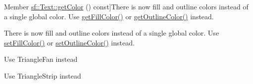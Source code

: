 \begin{DoxyRefList}
%
Member \mbox{\hyperlink{classsf_1_1_text_a77ba664285efd72ab4ce85b9cbbeeb21}{sf\+:\+:Text\+:\+:get\+Color}} () const]There is now fill and outline colors instead of a single global color. Use \mbox{\hyperlink{classsf_1_1_text_a6b4ba8c435b59e1e05f831e6230dc537}{get\+Fill\+Color()}} or \mbox{\hyperlink{classsf_1_1_text_a53559d563461089f1172571b375442dc}{get\+Outline\+Color()}} instead.  
\item[\label{deprecated__deprecated000016}%
\Hypertarget{deprecated__deprecated000016}%
Member \mbox{\hyperlink{classsf_1_1_text_a6ce65272d6d63ed01118366e92c68132}{sf\+:\+:Text\+:\+:set\+Color}} (const \mbox{\hyperlink{classsf_1_1_color}{Color}} \&color)]There is now fill and outline colors instead of a single global color. Use \mbox{\hyperlink{classsf_1_1_text_ab7bb3babac5a6da1802b2c3e1a3e6dcc}{set\+Fill\+Color()}} or \mbox{\hyperlink{classsf_1_1_text_aa19ec69c3b894e963602a6804ca68fe4}{set\+Outline\+Color()}} instead.  
\item[\label{deprecated__deprecated000003}%
\Hypertarget{deprecated__deprecated000003}%
Member \mbox{\hyperlink{group__graphics_gga5ee56ac1339984909610713096283b1ba5338a2c6d922151fe50f235036af8a20}{sf\+:\+:Triangles\+Fan}} ]Use Triangle\+Fan instead  
\item[\label{deprecated__deprecated000002}%
\Hypertarget{deprecated__deprecated000002}%
Member \mbox{\hyperlink{group__graphics_gga5ee56ac1339984909610713096283b1ba66643dbbb24bbacb405973ed80eebae0}{sf\+:\+:Triangles\+Strip}} ]Use Triangle\+Strip instead 
\end{DoxyRefList}